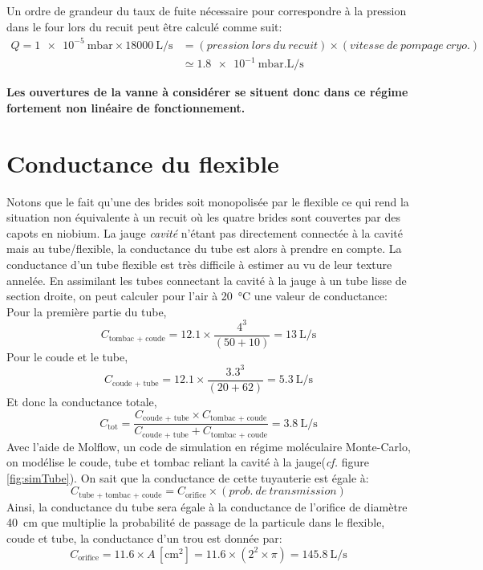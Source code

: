 Un ordre de grandeur du taux de fuite nécessaire pour correspondre à la pression dans le four lors du recuit peut être calculé comme suit:
\begin{align*}
    Q = \SI{1e-5}{\milli\bar}\times\SI{18000}{\liter\per\second} &= (pression~lors~du~recuit) \times (vitesse~de~pompage~cryo.)\\
    &\simeq \SI{1.8e-1}{\milli\bar.\liter\per\second}
\end{align*}

\textbf{Les ouvertures de la vanne à considérer se situent donc dans ce régime fortement non linéaire de fonctionnement.}

\section{Conductance du flexible}
Notons que le fait qu'une des brides soit monopolisée par le flexible ce qui rend la situation non équivalente à un recuit  où les quatre brides sont couvertes par des capots en niobium. La jauge \textit{cavité} n'étant pas directement connectée à la cavité mais au tube/flexible, la conductance du tube est alors à prendre en compte. La conductance d'un tube flexible est très difficile à estimer au vu de leur texture annelée. En assimilant les tubes connectant la cavité à la jauge à un tube lisse de section droite, on peut calculer\cite{pfeiffer} pour l'air à \SI{20}{\celsius} une valeur de conductance:
Pour la première partie du tube,
\[C_\text{tombac + coude} = \num{12.1}\times\frac{4^3}{(50+10)} = \SI{13}{\liter\per\second}\]
Pour le coude et le tube,
\[C_\text{coude + tube} = \num{12.1}\times\frac{\num{3.3}^3}{(20+62)} =  \SI{5.3}{\liter\per\second}\]
Et donc la conductance totale,
\[C_\text{tot} = \frac{C_\text{coude + tube}\times C_\text{tombac + coude}}{C_\text{coude + tube} + C_\text{tombac + coude}} =  \SI{3.8}{\liter\per\second}\]
Avec l'aide de Molflow, un code de simulation en régime moléculaire Monte-Carlo, on modélise le coude, tube et tombac reliant la cavité à la jauge(\textit{cf.} figure \ref{fig:simTube}). On sait que la conductance de cette tuyauterie est égale à:
\[C_\text{tube + tombac + coude} = C_\text{orifice}\times(prob.~de~transmission)\]
Ainsi, la conductance du tube sera égale à la conductance de l'orifice de diamètre \SI{40}{\centi\meter} que multiplie la probabilité de passage de la particule dans le flexible, coude et tube, la conductance d'un trou est donnée par:
\[C_\text{orifice} = \num{11.6}\times A\,[\si{\centi\meter\squared}] = \num{11.6}\times(2^2\times\pi)=\SI{145.8}{\liter\per\second}\]

